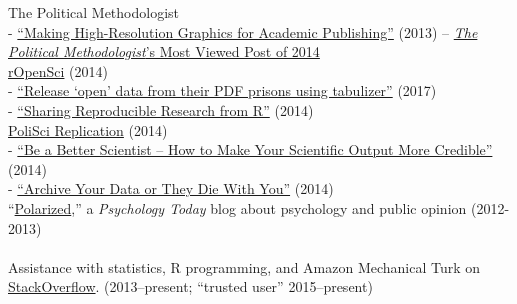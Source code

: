 \documentclass[12pt]{article}
\newcommand{\topic}[1]{\pagebreak[3]\indent {\color{lg}{\footnotesize #1 }}\\}
\newcommand{\entry}[1]{\indent {\color{lg}\guillemotright}\hspace{2pt}#1\vspace{.25em}\\}
\newcommand{\subentry}[1]{{\color{lg}-} #1\vspace{.25em}\\}
\begin{document}
		\entry{The Political Methodologist}
			\subentry{\href{https://thepoliticalmethodologist.com/2013/11/25/making-high-resolution-graphics-for-academic-publishing/}{``Making High-Resolution Graphics for Academic Publishing''} (2013) -- \href{http://thepoliticalmethodologist.com/2015/01/05/introducing-the-annual-tpm-most-viewed-post-award-and-our-2014-winner/}{\textit{The Political Methodologist}'s Most Viewed Post of 2014}}
		\entry{\href{http://ropensci.org/blog/}{rOpenSci} (2014)}
			\subentry{\href{https://ropensci.org/blog/2017/04/18/tabulizer/}{``Release `open' data from their PDF prisons using tabulizer''} (2017)}
            \subentry{\href{https://ropensci.org/blog/2014/02/20/dvn-dataverse-network/}{``Sharing Reproducible Research from R''} (2014)}
		\entry{\href{http://politicalsciencereplication.wordpress.com/}{PoliSci Replication} (2014)}
			\subentry{\href{https://politicalsciencereplication.wordpress.com/2014/06/04/guest-post-be-a-better-scientist-how-to-make-your-scientific-output-more-credible-by-thomas-leeper/}{``Be a Better Scientist -- How to Make Your Scientific Output More Credible''} (2014)}
			\subentry{\href{https://politicalsciencereplication.wordpress.com/2014/05/21/guest-post-why-reproducibility-requires-data-archiving-by-thomas-leeper/}{``Archive Your Data or They Die With You''} (2014)}
		\entry{``\href{http://www.psychologytoday.com/blog/polarized}{Polarized},'' a \textit{Psychology Today} blog about psychology and public opinion (2012-2013)}
	
	\topic{Miscellaneous}
		\entry{Assistance with statistics, R programming, and Amazon Mechanical Turk on \href{http://stackoverflow.com/users/2338862/thomas}{StackOverflow}. (2013--present; ``trusted user'' 2015--present)}
\end{document}
